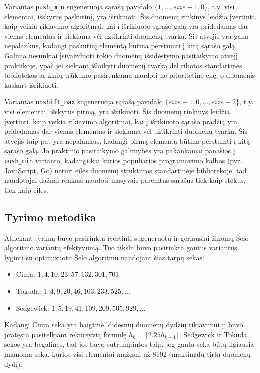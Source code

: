 \documentclass{VUMIFInfBakalaurinis}
\begin{document}
Variantas \verb|push_min| sugeneruoja sąrašą pavidalo $\{1, \dots, size-1, 0\}$, t.y. visi elementai, išskyrus paskutinį, yra išrikiuoti.
Šis duomenų rinkinys leidžia įvertinti, kaip veikia rikiavimo algoritmai, kai į išrikiuoto sąrašo galą yra pridedamas dar vienas elementas ir siekiama vėl užtikrinti duomenų tvarką.
Šis atvejis yra gana nepalankus, kadangi paskutinį elementą būtina perstumti į kitą sąrašo galą.
Galima nesunkiai įsivaizduoti tokio duomenų išsidėstymo pasitaikymo atvejį praktikoje, ypač jei siekiant išlaikyti duomenų tvarką dėl ribotos standartinės bibliotekos ar
žinių trūkumo pasirenkama naudoti ne prioritetinę eilę, o duomenis kaskart išrikiuoti.

Variantas \verb|unshift_max| sugeneruoja sąrašą pavidalo $\{size-1, 0, \dots, size-2\}$, t.y. visi elementai, išskyrus pirmą, yra išrikiuoti.
Šis duomenų rinkinys leidžia įvertinti, kaip veikia rikiavimo algoritmai, kai į išrikiuoto sąrašo pradžią yra pridedamas dar vienas elementas ir siekiama vėl užtikrinti duomenų tvarką.
Šis atvejis taip pat yra nepalankus, kadangi pirmą elementą būtina perstumti į kitą sąrašo galą.
Jo praktinio pasitaikymo galimybės yra pakankamai panašios į \verb|push_min| varianto, kadangi kai kurios populiarios programavimo kalbos (pvz. JavaScript, Go)
neturi eilės duomenų struktūros standartinėje bibliotekoje, tad naudotojai dažnai renkasi naudoti masyvais paremtus sąrašus tiek kaip stekus, tiek kaip eiles.

\subsection{Tyrimo metodika}

Atliekant tyrimą buvo pasirinkta įvertinti sugeneruotų ir geriausiai žinomų Šelo algoritmo variantų efektyvumą.
Tuo tikslu buvo pasirinkta gautus variantus lyginti su optimizuotu Šelo algoritmu naudojant šias tarpų sekas:

\begin{itemize}
  \item Ciura: $1, 4, 10, 23, 57, 132, 301, 701$ \cite{ciura2001best}
  \item Tokuda: $1, 4, 9, 20, 46, 103, 233, 525, \ldots $ \cite{tokuda1992}
  \item Sedgewick: $1, 5, 19, 41, 109, 209, 505, 929, \ldots$ \cite{SEDGEWICK1986159}
\end{itemize}

Kadangi Ciura seka yra baigtinė, didesnių duomenų dydžių rikiavimui ji buvo pratęsta pasitelkiant rekursyvią formulę $h_{k}=\lfloor 2.25h_{k-1}\rfloor$.
Sedgewick ir Tokuda sekos yra begalinės, tad jos buvo sutrumpintos taip, jog gauta seka būtų ilgiausia įmanoma seka, kurios visi elementai mažesni už 8192 (maksimalų tirtą duomenų dydį).
\end{document}
